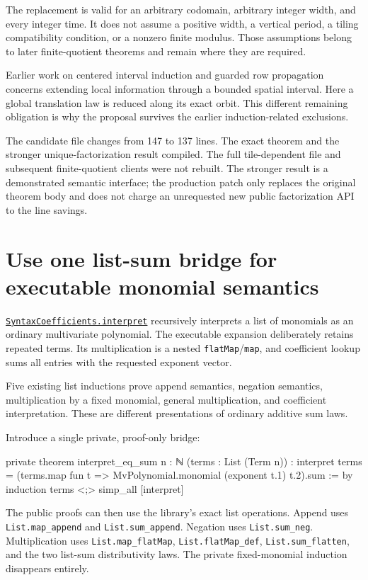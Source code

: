\documentclass[11pt,letterpaper]{article}
\newcommand{\code}[1]{\nolinkurl{#1}}
\newcommand{\source}[2]{\href{https://github.com/VladimirReshetnikov/ProveIt/blob/efa64ca941cdae37bb6f7fc5093ae8bb69296ca3/Computability/DiophantineConsistency/Lean/DiophantineConsistency/#1.lean}{\code{#1.#2}}}
\begin{document}
The replacement is valid for an arbitrary codomain, arbitrary integer width, and every integer time. It does not assume a positive width, a vertical period, a tiling compatibility condition, or a nonzero finite modulus. Those assumptions belong to later finite-quotient theorems and remain where they are required.

Earlier work on centered interval induction and guarded row propagation concerns extending local information through a bounded spatial interval. Here a global translation law is reduced along its exact orbit. This different remaining obligation is why the proposal survives the earlier induction-related exclusions.

The candidate file changes from 147 to 137 lines. The exact theorem and the stronger unique-factorization result compiled. The full tile-dependent file and subsequent finite-quotient clients were not rebuilt. The stronger result is a demonstrated semantic interface; the production patch only replaces the original theorem body and does not charge an unrequested new public factorization API to the line savings.

\section{Use one list-sum bridge for executable monomial semantics}
\label{sec:list}

\source{SyntaxCoefficients}{interpret} recursively interprets a list of monomials as an ordinary multivariate polynomial. The executable expansion deliberately retains repeated terms. Its multiplication is a nested \code{flatMap}/\code{map}, and coefficient lookup sums all entries with the requested exponent vector.

Five existing list inductions prove append semantics, negation semantics, multiplication by a fixed monomial, general multiplication, and coefficient interpretation. These are different presentations of ordinary additive sum laws.

Introduce a single private, proof-only bridge:

\begin{Lean}
private theorem interpret_eq_sum {n : ℕ} (terms : List (Term n)) :
    interpret terms =
      (terms.map fun t => MvPolynomial.monomial (exponent t.1) t.2).sum := by
  induction terms <;> simp_all [interpret]
\end{Lean}

The public proofs can then use the library's exact list operations. Append uses \code{List.map_append} and \code{List.sum_append}. Negation uses \code{List.sum_neg}. Multiplication uses \code{List.map_flatMap}, \code{List.flatMap_def}, \code{List.sum_flatten}, and the two list-sum distributivity laws. The private fixed-monomial induction disappears entirely.
\end{document}
